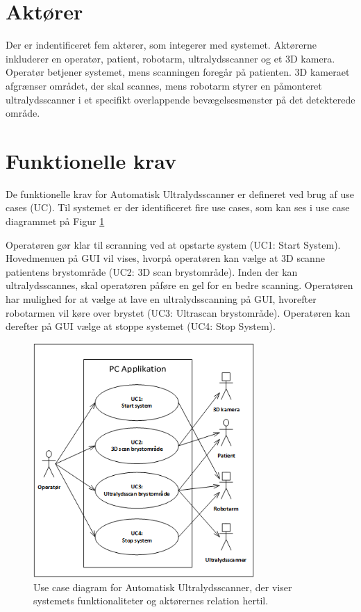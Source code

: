 \section{Aktører}
Der er indentificeret fem aktører, som integerer med systemet. Aktørerne inkluderer en operatør, patient, robotarm, ultralydsscanner og et 3D kamera. Operatør betjener systemet, mens scanningen foregår på patienten. 3D kameraet afgrænser området, der skal scannes, mens robotarm styrer en påmonteret ultralydsscanner i et specifikt overlappende bevægelsesmønster på det detekterede område.

\section{Funktionelle krav}
De funktionelle krav for Automatisk Ultralydsscanner er defineret ved brug af use cases (UC). Til systemet er der identificeret fire use cases, som kan ses i use case diagrammet på Figur \ref{UseCaseDiagram} 

Operatøren gør klar til scranning ved at opstarte system (UC1: Start System). Hovedmenuen på GUI vil vises, hvorpå operatøren kan vælge at 3D scanne patientens brystområde (UC2: 3D scan brystområde). Inden der kan ultralydsscannes, skal operatøren påføre en gel for en bedre scanning. Operatøren har mulighed for at vælge at lave en ultralydsscanning på GUI, hvorefter robotarmen vil køre over brystet (UC3: Ultrascan brystområde).  Operatøren kan derefter på GUI vælge at stoppe systemet (UC4: Stop System). 

\begin{figure}[H]
    \centering
    \includegraphics[width=0.75\textwidth]{figurer/d/Kravspecifikation/UseCaseDiagram}
    \caption{Use case diagram for Automatisk Ultralydsscanner, der viser systemets funktionaliteter og aktørernes relation hertil.}
    \label{UseCaseDiagram}
\end{figure}

